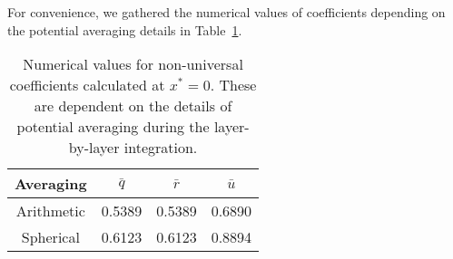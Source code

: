 For convenience, we gathered the numerical values of coefficients depending on the potential averaging details in Table~\ref{tab:num_coef_vs_average}.
\begin{table}[h]
	\caption{Numerical values for non-universal coefficients calculated at $x^* = 0$. These are dependent on the details of potential averaging during the layer-by-layer integration.}
	\begin{center}
		\begin{tabular}{|c|c|c|c|}
			\hline
			Averaging & $\bar{q}$ \quad & $\bar{r}$ & $\bar{u}$ \\
			\hline
			Arithmetic & 0.5389  & 0.5389 & 0.6890 \\
			Spherical & 0.6123 & 0.6123 & 0.8894 \\
			\hline
		\end{tabular}
	\end{center}
	\label{tab:num_coef_vs_average}
\end{table}
